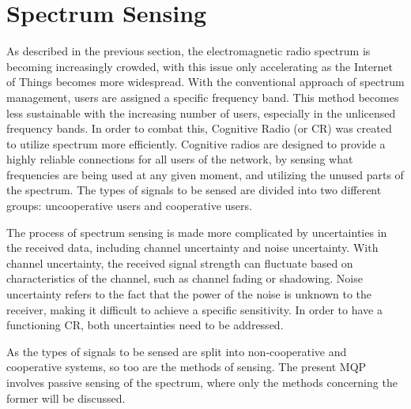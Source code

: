 \section{Spectrum Sensing}
As described in the previous section, the electromagnetic radio spectrum is becoming increasingly crowded, with this issue only accelerating as the Internet of Things becomes more widespread\cite{sensing_iot}. With the conventional approach of spectrum management, users are assigned a specific frequency band. This method becomes less sustainable with the increasing number of users, especially in the unlicensed frequency bands. In order to combat this, Cognitive Radio (or CR) was created to utilize spectrum more efficiently\cite{wyglinski_book}. Cognitive radios are designed to provide a highly reliable connections for all users of the network, by sensing what frequencies are being used at any given moment, and utilizing the unused parts of the spectrum. The types of signals to be sensed are divided into two different groups: uncooperative users and cooperative users\cite{spectrum_sense_methods}. \par
The process of spectrum sensing is made more complicated by uncertainties in the received data, including channel uncertainty and noise uncertainty. With channel uncertainty, the received signal strength can fluctuate based on characteristics of the channel, such as channel fading or shadowing. Noise uncertainty refers to the fact that the power of the noise is unknown to the receiver, making it difficult to achieve a specific sensitivity\cite{spectrum_sense_methods}. In order to have a functioning CR, both uncertainties need to be addressed. \par
As the types of signals to be sensed are split into non-cooperative and cooperative systems, so too are the methods of sensing. The present MQP involves passive sensing of the spectrum, where only the methods concerning the former will be discussed.

